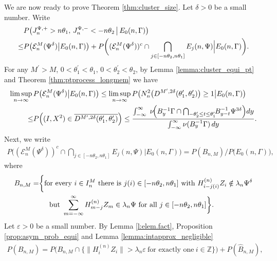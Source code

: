 \documentclass[11pt,reqno]{amsart}
\numberwithin{equation}{section}
\theoremstyle{definition}
\theoremstyle{remark}
\theoremstyle{definition}
\newcommand{\eps}{\varepsilon}
\newcommand{\cE}{\mathcal{E}}
\newcommand{\ZZ}{\mathbb{Z}}
\newcommand{\bbz}{\ZZ}
\begin{document}
We are now ready to prove Theorem \ref{thm:cluster_size}.  Let
$\delta>0$ be a small number. Write
\begin{align} \label{e:split.upper.cl}
    & P\big(J_n^{\Psi,+} > n\theta_1,\, J_n^{\Psi,-} < -n\theta_2 \,\big|\, E_0(n,\Gamma)\big) \\
       \leq  &  P\bigl(  \cE_n^M(\Psi^\delta)\big|E_0(n,\Gamma)\bigr)
               +  P\bigg((\cE_n^M(\Psi^\delta))^c\cap \bigcap_{j \in [-n\theta_2,n\theta_1]}
               E_j(n, \Psi) \Big|E_0(n,\Gamma)\biggr). \notag 
\end{align}
For any 
$M^\prime >M$, $   0<\theta_1^\prime<\theta_1, \,
0<\theta_2^\prime<\theta_2$, by Lemma \ref{lemma:cluster_equi_pt} and
Theorem \ref{thm:ptprocess_longmem} we have 
\begin{align} \label{e:lims.E}
\limsup_{n\to\infty} \, &P\bigl(  \cE_n^M(\Psi^\delta)\big|E_0(n,\Gamma)\bigr)
\leq \limsup_{n\to\infty} P\bigl(N_n^2\bigl(D^{M^\prime,2\delta}(\theta_1^\prime, \theta_2^\prime)\bigr)
    \geq 1\big|E_0(n,\Gamma)\bigr) \\
\notag \leq &P\Bigl( (I,X^2)\in \overline{D^{M^\prime,2\delta}(\theta_1^\prime, \theta_2^\prime)}\Bigr)
\leq  \frac{\int_{-\infty}^\infty  \;
        \nu\!\Big(B_y^{-1} \Gamma \cap \bigcap_{-\theta_2^\prime\le t \le \theta_1^\prime} \!\!  B_{y-t}^{-1}\Psi^{3\delta}\Big) dy}
        {\int_{-\infty}^\infty \nu(B_y^{-1} \Gamma) \,dy} .
\end{align}
Next, we write 
\begin{align*}
P\bigg((\cE_n^M(\Psi^\delta))^c\cap \bigcap_{j \in [-n\theta_2,n\theta_1]}
               E_j(n, \Psi) \Big|E_0(n,\Gamma)\biggr)
= P(B_{n,M})/P\bigl(E_0(n,\Gamma)\bigr),
\end{align*}
where
\begin{align*}
B_{n,M} =&\bigg\{ \text{for every} \ i\in I_n^M \ \text{there is} \
  j(i)\in [-n\theta_2,n\theta_1] \ \text{with} \ H_{i-j(i)}^{(n)}Z_i\notin
  \lambda_n \Psi^\delta \\
&\hskip 0.2 in\text{but} \ \sum_{m=-\infty}^\infty
  H_{m-j}^{(n)}Z_m \in \lambda_n\Psi \ \text{for all} \ j \in
  [-n\theta_2,n\theta_1]\bigg\}. 
\end{align*}
Let $\eps>0$ be a small number. By Lemma \ref{l:elem.fact},
Proposition \ref{prop:asym_prob_equi} and Lemma \ref{lemma:intapprox_negligible}
\begin{align} \label{e:Bnm.one}
P(B_{n,M}) = P\bigl( B_{n,M} \cap \{ \| H_i^{(n)} Z_i\|>\lambda_n\eps
  \ \text{for exactly one} \ i\in\bbz\}\bigr) +P(\hat B_{n,M}), 
\end{align}
\end{document}

